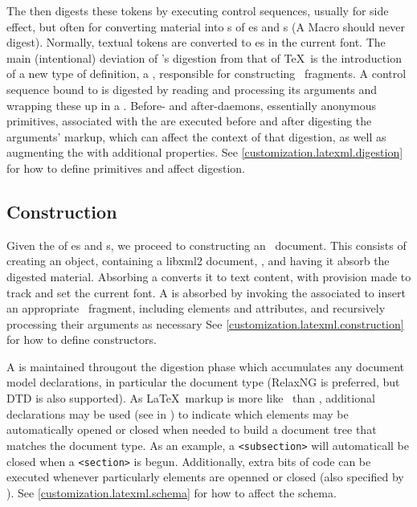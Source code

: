 \documentclass{book}
\newcommand{\xmlcode}{\lstinline[style=xml]}
\begin{document}
The  then digests these tokens by executing  control 
sequences, usually for side effect, but often for converting material
into s of es and s
(A Macro should never digest).
Normally, textual tokens are converted to es in the current font.
The main (intentional) deviation of \LaTeXML's digestion from that of \TeX\ is
the introduction of a new type of definition, a ,
responsible for constructing \XML\ fragments.
A control sequence bound to  is digested by
reading and processing its arguments and wrapping these up in a .
Before- and after-daemons, essentially anonymous primitives, associated with
the  are executed before and after digesting the 
arguments' markup, which can affect the context of that digestion, as well
as augmenting the  with additional properties.
See \ref{customization.latexml.digestion} for how to define primitives
and affect digestion.


\subsection{Construction}\label{architecture.construction}
%
%
%
Given the  of es and s,
we proceed to constructing an \XML\ document.
This consists of creating an  object, containing
a libxml2 document, , and having it absorb the digested
material. Absorbing a  converts it to text content, with provision
made to track and set the current font.
A  is absorbed by invoking the associated 
to insert an appropriate \XML\ fragment, including elements and attributes,
and recursively processing their arguments as necessary
See \ref{customization.latexml.construction} for how to define
constructors.

A  is maintained througout the digestion phase which accumulates
any document model declarations, in particular the document type (RelaxNG is
preferred, but DTD is also supported).  As \LaTeX\ markup is more
like \SGML\ than \XML, additional declarations may be used (see  in )
to indicate which elements may
be automatically opened or closed when needed to build a document tree that matches
the document type.  As an example, a \xmlcode{<subsection>} will automaticall be closed
when a \xmlcode{<section>} is begun.  Additionally, extra bits of code can
be executed whenever particularly elements are openned or closed (also
specified by ).
See \ref{customization.latexml.schema} for how to affect the schema.
\end{document}
